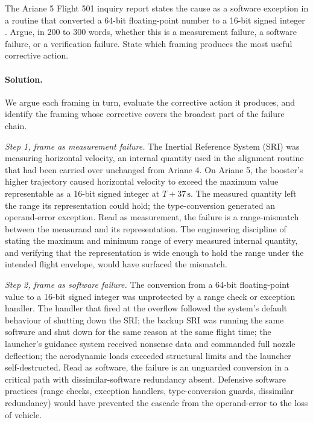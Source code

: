 \begin{exercise}
The Ariane 5 Flight 501 inquiry report states the cause as a software
exception in a routine that converted a 64-bit floating-point number
to a 16-bit signed integer \cite{acc:ariane501-ifr}. Argue, in 200
to 300 words, whether this is a measurement failure, a software
failure, or a verification failure. State which framing produces the
most useful corrective action.

\paragraph{Solution.}
We argue each framing in turn, evaluate the corrective action it
produces, and identify the framing whose corrective covers the
broadest part of the failure chain.

\textit{Step 1, frame as measurement failure.} The Inertial Reference
System (SRI) was measuring horizontal velocity, an internal quantity
used in the alignment routine that had been carried over unchanged
from Ariane 4. On Ariane 5, the booster's higher trajectory caused
horizontal velocity to exceed the maximum value representable as a
16-bit signed integer at $T+37 \,\si{\second}$. The measured quantity
left the range its representation could hold; the type-conversion
generated an operand-error exception. Read as measurement, the
failure is a range-mismatch between the measurand and its
representation. The engineering discipline of stating the maximum and
minimum range of every measured internal quantity, and verifying that
the representation is wide enough to hold the range under the
intended flight envelope, would have surfaced the mismatch.

\textit{Step 2, frame as software failure.} The conversion from a
64-bit floating-point value to a 16-bit signed integer was
unprotected by a range check or exception handler. The handler that
fired at the overflow followed the system's default behaviour of
shutting down the SRI; the backup SRI was running the same software
and shut down for the same reason at the same flight time; the
launcher's guidance system received nonsense data and commanded full
nozzle deflection; the aerodynamic loads exceeded structural limits
and the launcher self-destructed. Read as software, the failure is
an unguarded conversion in a critical path with dissimilar-software
redundancy absent. Defensive software practices (range checks,
exception handlers, type-conversion guards, dissimilar redundancy)
would have prevented the cascade from the operand-error to the
loss of vehicle.


\end{exercise}
